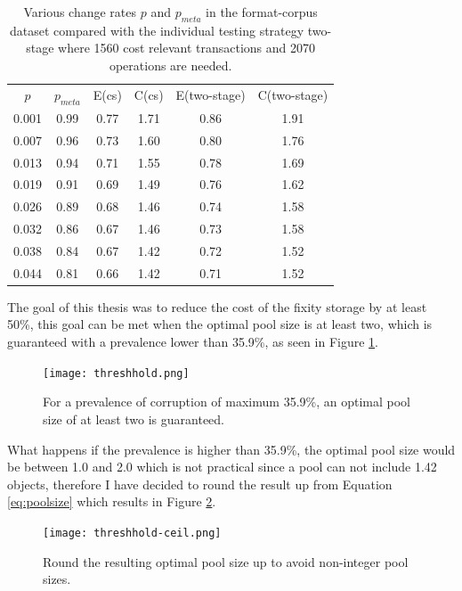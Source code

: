 \begin{table}[t]
    \centering
    \begin{tabular}{c c c c c c}
        $p$ & $p_{meta}$ & E(\acrshort{cs}) & C(\acrshort{cs}) & E(\acrshort{two-stage}) & C(\acrshort{two-stage})\\
        0.001 &	0.99 & 0.77 & 1.71 & 0.86 & 1.91 \\
        0.007 &	0.96 & 0.73 & 1.60 & 0.80 & 1.76 \\
        0.013 &	0.94 & 0.71 & 1.55 & 0.78 & 1.69 \\
        0.019 &	0.91 & 0.69 & 1.49 & 0.76 & 1.62 \\
        0.026 &	0.89 & 0.68 & 1.46 & 0.74 & 1.58 \\
        0.032 &	0.86 & 0.67 & 1.46 & 0.73 & 1.58 \\
        0.038 &	0.84 & 0.67 & 1.42 & 0.72 & 1.52 \\
        0.044 &	0.81 & 0.66 & 1.42 & 0.71 & 1.52 
    \end{tabular}
    \caption{Various change rates $p$ and $p_{meta}$ in the format-corpus dataset compared with the individual testing strategy \acrshort{two-stage} where 1560 cost relevant transactions and 2070 operations are needed.}
    \label{tb:split-off}
\end{table}

The goal of this thesis was to reduce the cost of the fixity storage by at least 50\%, this goal can be met when the optimal pool size is at least two, which is guaranteed with a prevalence lower than 35.9\%, as seen in Figure \ref{fig:threshhold}.
\begin{figure}[tb]
    \caption{For a prevalence of corruption of maximum 35.9\%, an optimal pool size of at least two is guaranteed.}
    \label{fig:threshhold}
    \centering
    \texttt{[image: threshhold.png]}
\end{figure}
What happens if the prevalence is higher than 35.9\%, the optimal pool size would be between 1.0 and 2.0 which is not practical since a pool can not include 1.42 objects, therefore I have decided to round the result up from Equation \ref{eq:poolsize} which results in Figure \ref{fig:threshhold-ceil}.
\begin{figure}[tb]
    \caption{Round the resulting optimal pool size up to avoid non-integer pool sizes.}
    \label{fig:threshhold-ceil}
    \centering
    \texttt{[image: threshhold-ceil.png]}
\end{figure}
